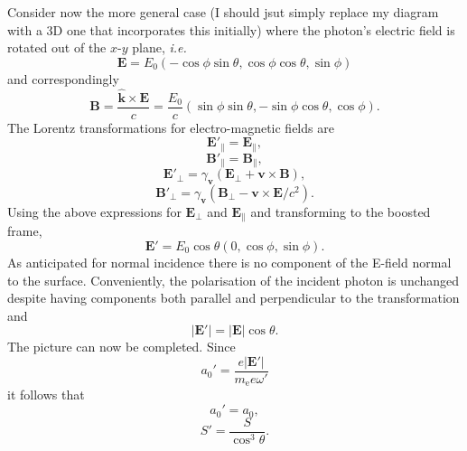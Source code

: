 Consider now the more general case (I should jsut simply replace my diagram with a 3D one that incorporates this initially) where the photon's electric field is rotated out of the $x$-$y$ plane, \textit{i.e.}
\begin{equation}
	\mathbf{E} = E_0(-\cos\phi\sin\theta,\cos\phi\cos\theta,\sin\phi)
\end{equation}
and correspondingly
\begin{equation}
	\mathbf{B} = \frac{\hat{\mathbf{k}} \times \mathbf{E}}{c}= \frac{E_0}{c}(\sin\phi\sin\theta,-\sin\phi\cos\theta,\cos\phi).
\end{equation}
The Lorentz transformations for electro-magnetic fields are
\begin{equation}
	\mathbf{E}'_\parallel = \mathbf{E}_\parallel,
\end{equation}
\begin{equation}
	\mathbf{B}'_\parallel = \mathbf{B}_\parallel,
\end{equation}
\begin{equation}
	\mathbf{E}'_\perp = \gamma_\mathbf{v}(\mathbf{E}_\perp + \mathbf{v} \times \mathbf{B}),
\end{equation}
\begin{equation}
	\mathbf{B}'_\perp = \gamma_\mathbf{v}(\mathbf{B}_\perp - \mathbf{v} \times \mathbf{E}/c^2).
\end{equation}
Using the above expressions for $\mathbf{E}_\perp$ and $\mathbf{E}_\parallel$ and transforming to the boosted frame,
\begin{equation}
	\mathbf{E}' = E_0\cos\theta (0,\cos\phi,\sin\phi).
\end{equation}
As anticipated for normal incidence there is no component of the E-field normal to the surface. Conveniently, the polarisation of the incident photon is unchanged despite having components both parallel and perpendicular to the transformation and 
\begin{equation}
	|\mathbf{E}'| = |\mathbf{E}|\cos\theta.
\end{equation}
The picture can now be completed. Since
\begin{equation}
	a_0' = \frac{e|\mathbf{E}'|}{m_\mathrm{e}e\omega'}
\end{equation}
it follows that
\begin{equation}
	a_0' = a_0,
\end{equation}
\begin{equation}
	S' = \frac{S}{\cos^3\theta}.
\end{equation}

